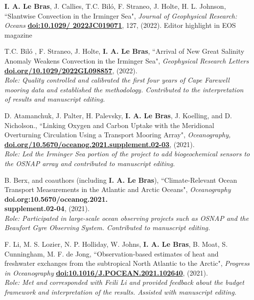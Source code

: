 \documentclass[paper=letter,fontsize=11pt]{scrartcl} %
\newcommand{\PaperEntry}[6]{
		\noindent #1, ``#2", \textit{#3} \textbf{#4}, #5 (#6).}
\begin{document}
\begin{etaremune}
\item \PaperEntry{\textbf{I. A. Le Bras}, J. Callies, T.C. Bil\'{o}, F. Straneo, J. Holte, H. L. Johnson}{Slantwise Convection in the Irminger Sea}{Journal of Geophysical Research: Oceans}{\url{doi:10.1029/ 2022JC019071}}{127,}{2022} Editor highlight in EOS magazine

\item \PaperEntry{T.C. Bil\'{o} , F. Straneo, J. Holte, \textbf{I. A. Le Bras}}{Arrival of New Great Salinity Anomaly Weakens Convection in the Irminger Sea}{Geophysical Research Letters\\}{\url{doi.org/10.1029/2022GL098857}}{}{2022}\\
\emph{Role: Quality controlled and calibrated the first four years of Cape Farewell mooring data and established the methodology. Contributed to the interpretation of results and manuscript editing.}

\item \PaperEntry{D. Atamanchuk, J. Palter, H. Palevsky, \textbf{I. A. Le Bras}, J. Koelling, and D. Nicholson.}{Linking Oxygen and Carbon Uptake with the Meridional Overturning Circulation Using a Transport Mooring Array}{Oceanography,}{\url{doi.org/10.5670/oceanog.2021.supplement.02-03}}{}{2021}\\
\emph{Role: Led the Irminger Sea portion of the project to add biogeochemical sensors to the OSNAP array and contributed to manuscript editing.}

\item \PaperEntry{B. Berx, and coauthors (including \textbf{I. A. Le Bras})}{Climate-Relevant Ocean Transport Measurements in the Atlantic and Arctic Oceans}{Oceanography}{doi.org:10.5670/oceanog.2021.\\supplement.02-04}{}{2021}\\
\emph{Role: Participated in large-scale ocean observing projects such as OSNAP and the Beaufort Gyre Observing System. Contributed to manuscript editing.}

\item \PaperEntry{F. Li, M. S. Lozier, N. P. Holliday, W. Johns, \textbf{I. A. Le Bras}, B. Moat, S. Cunningham, M. F. de Jong}{Observation-based estimates of heat and freshwater exchanges from the subtropical North Atlantic to the Arctic}{Progress in Oceanography}{\url{doi:10.1016/J.POCEAN.2021.102640}}{}{2021}\\
\emph{Role: Met and corresponded with Feili Li and provided feedback about the budget framework and interpretation of the results. Assisted with manuscript editing.}


\end{etaremune}
\end{document}
